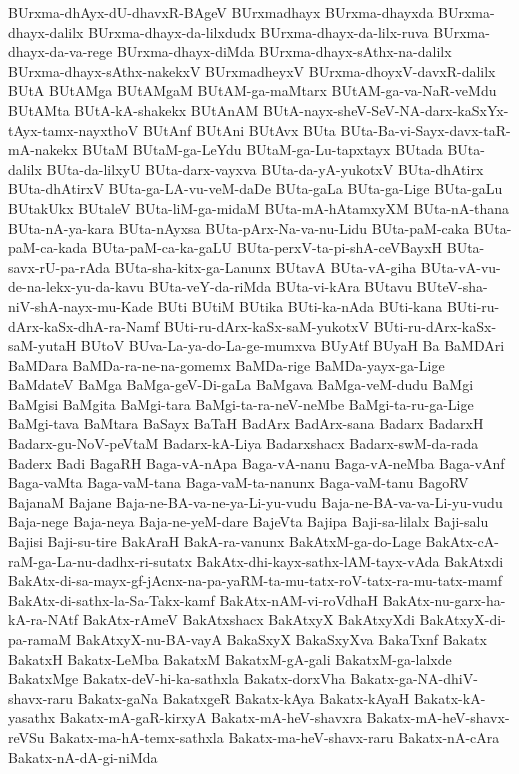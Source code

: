 {BUrxma-dhAyx-dU-dhavxR-BAgeV
BUrxmadhayx
BUrxma-dhayxda
BUrxma-dhayx-dalilx
BUrxma-dhayx-da-lilxdudx
BUrxma-dhayx-da-lilx-ruva
BUrxma-dhayx-da-va-rege
BUrxma-dhayx-diMda
BUrxma-dhayx-sAthx-na-dalilx
BUrxma-dhayx-sAthx-nakekxV
BUrxmadheyxV
BUrxma-dhoyxV-davxR-dalilx
BUtA
BUtAMga
BUtAMgaM
BUtAM-ga-maMtarx
BUtAM-ga-va-NaR-veMdu
BUtAMta
BUtA-kA-shakekx
BUtAnAM
BUtA-nayx-sheV-SeV-NA-darx-kaSxYx-tAyx-tamx-nayxthoV
BUtAnf
BUtAni
BUtAvx
BUta
BUta-Ba-vi-Sayx-davx-taR-mA-nakekx
BUtaM
BUtaM-ga-LeYdu
BUtaM-ga-Lu-tapxtayx
BUtada
BUta-dalilx
BUta-da-lilxyU
BUta-darx-vayxva
BUta-da-yA-yukotxV
BUta-dhAtirx
BUta-dhAtirxV
BUta-ga-LA-vu-veM-daDe
BUta-gaLa
BUta-ga-Lige
BUta-gaLu
BUtakUkx
BUtaleV
BUta-liM-ga-midaM
BUta-mA-hAtamxyXM
BUta-nA-thana
BUta-nA-ya-kara
BUta-nAyxsa
BUta-pArx-Na-va-nu-Lidu
BUta-paM-caka
BUta-paM-ca-kada
BUta-paM-ca-ka-gaLU
BUta-perxV-ta-pi-shA-ceVBayxH
BUta-savx-rU-pa-rAda
BUta-sha-kitx-ga-Lanunx
BUtavA
BUta-vA-giha
BUta-vA-vu-de-na-lekx-yu-da-kavu
BUta-veY-da-riMda
BUta-vi-kAra
BUtavu
BUteV-sha-niV-shA-nayx-mu-Kade
BUti
BUtiM
BUtika
BUti-ka-nAda
BUti-kana
BUti-ru-dArx-kaSx-dhA-ra-Namf
BUti-ru-dArx-kaSx-saM-yukotxV
BUti-ru-dArx-kaSx-saM-yutaH
BUtoV
BUva-La-ya-do-La-ge-mumxva
BUyAtf
BUyaH
Ba
BaMDAri
BaMDara
BaMDa-ra-ne-na-gomemx
BaMDa-rige
BaMDa-yayx-ga-Lige
BaMdateV
BaMga
BaMga-geV-Di-gaLa
BaMgava
BaMga-veM-dudu
BaMgi
BaMgisi
BaMgita
BaMgi-tara
BaMgi-ta-ra-neV-neMbe
BaMgi-ta-ru-ga-Lige
BaMgi-tava
BaMtara
BaSayx
BaTaH
BadArx
BadArx-sana
Badarx
BadarxH
Badarx-gu-NoV-peVtaM
Badarx-kA-Liya
Badarxshacx
Badarx-swM-da-rada
Baderx
Badi
BagaRH
Baga-vA-nApa
Baga-vA-nanu
Baga-vA-neMba
Baga-vAnf
Baga-vaMta
Baga-vaM-tana
Baga-vaM-ta-nanunx
Baga-vaM-tanu
BagoRV
BajanaM
Bajane
Baja-ne-BA-va-ne-ya-Li-yu-vudu
Baja-ne-BA-va-va-Li-yu-vudu
Baja-nege
Baja-neya
Baja-ne-yeM-dare
BajeVta
Bajipa
Baji-sa-lilalx
Baji-salu
Bajisi
Baji-su-tire
BakAraH
BakA-ra-vanunx
BakAtxM-ga-do-Lage
BakAtx-cA-raM-ga-La-nu-dadhx-ri-sutatx
BakAtx-dhi-kayx-sathx-lAM-tayx-vAda
BakAtxdi
BakAtx-di-sa-mayx-gf-jAcnx-na-pa-yaRM-ta-mu-tatx-roV-tatx-ra-mu-tatx-mamf
BakAtx-di-sathx-la-Sa-Takx-kamf
BakAtx-nAM-vi-roVdhaH
BakAtx-nu-garx-ha-kA-ra-NAtf
BakAtx-rAmeV
BakAtxshacx
BakAtxyX
BakAtxyXdi
BakAtxyX-di-pa-ramaM
BakAtxyX-nu-BA-vayA
BakaSxyX
BakaSxyXva
BakaTxnf
Bakatx
BakatxH
Bakatx-LeMba
BakatxM
BakatxM-gA-gali
BakatxM-ga-lalxde
BakatxMge
Bakatx-deV-hi-ka-sathxla
Bakatx-dorxVha
Bakatx-ga-NA-dhiV-shavx-raru
Bakatx-gaNa
BakatxgeR
Bakatx-kAya
Bakatx-kAyaH
Bakatx-kA-yasathx
Bakatx-mA-gaR-kirxyA
Bakatx-mA-heV-shavxra
Bakatx-mA-heV-shavx-reVSu
Bakatx-ma-hA-temx-sathxla
Bakatx-ma-heV-shavx-raru
Bakatx-nA-cAra
Bakatx-nA-dA-gi-niMda
}

